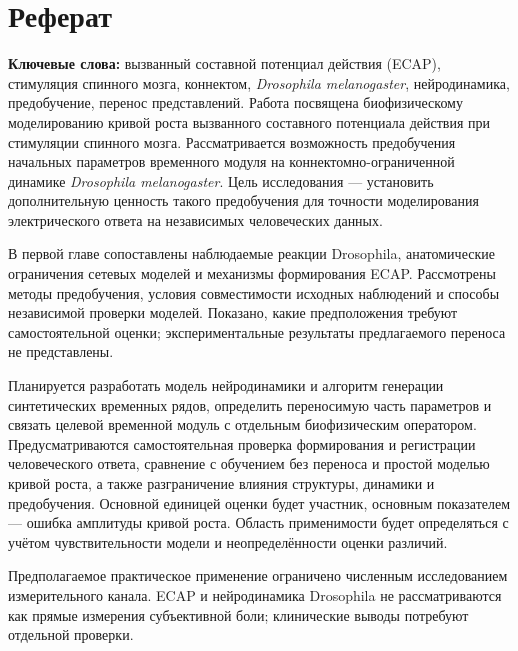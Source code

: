 \chapter*{Реферат}
{\centering\bfseries\WorkingTitle\par}
\medskip
{\centering\AuthorName\par}
\medskip
\noindent\textbf{Ключевые слова:} вызванный составной потенциал действия (ECAP), стимуляция спинного мозга, коннектом, \textit{Drosophila melanogaster}, нейродинамика, предобучение, перенос представлений.
\medskip
Работа посвящена биофизическому моделированию кривой роста вызванного составного потенциала действия при стимуляции спинного мозга. Рассматривается возможность предобучения начальных параметров временного модуля на коннектомно-ограниченной динамике \textit{Drosophila melanogaster}. Цель исследования --- установить дополнительную ценность такого предобучения для точности моделирования электрического ответа на независимых человеческих данных.

В первой главе сопоставлены наблюдаемые реакции Drosophila, анатомические ограничения сетевых моделей и механизмы формирования ECAP. Рассмотрены методы предобучения, условия совместимости исходных наблюдений и способы независимой проверки моделей. Показано, какие предположения требуют самостоятельной оценки; экспериментальные результаты предлагаемого переноса не представлены.

Планируется разработать модель нейродинамики и алгоритм генерации синтетических временных рядов, определить переносимую часть параметров и связать целевой временной модуль с отдельным биофизическим оператором. Предусматриваются самостоятельная проверка формирования и регистрации человеческого ответа, сравнение с обучением без переноса и простой моделью кривой роста, а также разграничение влияния структуры, динамики и предобучения. Основной единицей оценки будет участник, основным показателем --- ошибка амплитуды кривой роста. Область применимости будет определяться с учётом чувствительности модели и неопределённости оценки различий.

Предполагаемое практическое применение ограничено численным исследованием измерительного канала. ECAP и нейродинамика Drosophila не рассматриваются как прямые измерения субъективной боли; клинические выводы потребуют отдельной проверки.
